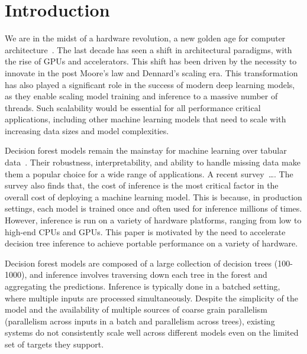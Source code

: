 \section{Introduction}
\label{sec:intro}
We are in the midst of a hardware revolution, a new golden age for computer architecture~\cite{GoldenAge}. The last 
decade has seen a shift in architectural paradigms, with the rise of GPUs and accelerators. This shift has been driven
by the necessity to innovate in the post Moore's law and Dennard's scaling era. This transformation has also played 
a significant role in the success of modern deep learning models, as they enable scaling model training and inference 
to a massive number of threads. Such scalability would be essential for all performance critical applications, including
other machine learning models that need to scale with increasing data sizes and model complexities. 

Decision forest models remain the mainstay for machine learning over tabular data~\cite{DLNotAllYouNeed,TreebasedOutperformDL}. 
Their robustness, interpretability, and ability to handle missing data make them a popular choice for a wide range of applications. 
A recent survey~\cite{kaggle}\dots. 
The survey also finds that, the cost of inference is the most critical factor in the overall cost of deploying a machine learning model.
This is because, in production settings, each model is trained once and often used for inference millions of times. 
However, inference is run on a variety of hardware platforms, ranging from low to high-end CPUs and GPUs. 
This paper is motivated by the need to accelerate decision tree inference to achieve portable performance on a variety of hardware.

Decision forest models are composed of a large collection of decision trees (100-1000), and inference involves 
traversing down each tree in the forest and aggregating the predictions. Inference is typically done in a batched
setting, where multiple inputs are processed simultaneously.
Despite the simplicity of the model and the availability of multiple sources of coarse grain parallelism (parallelism 
across inputs in a batch and parallelism across trees), existing systems do not consistently scale well across different
models even on the limited set of targets they support. 

